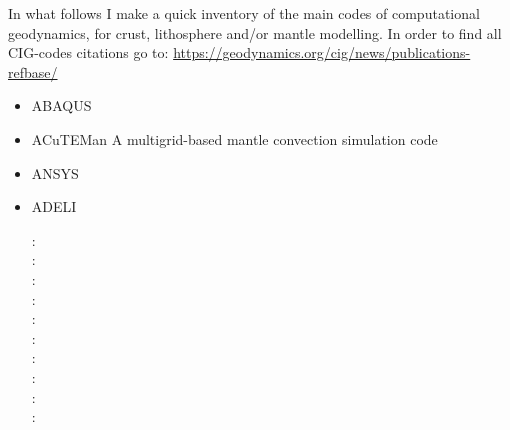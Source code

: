 
In what follows I make a quick inventory of the main codes of computational geodynamics, 
for crust, lithosphere and/or mantle modelling.
In order to find all CIG-codes citations go to: 
\url{https://geodynamics.org/cig/news/publications-refbase/}

\begin{itemize}

\item {\codefont ABAQUS} 

{\small
\noindent
\cite{brry01}
\cite{gedh02}
\cite{fumr03}
\cite{hapf06}
\cite{camg07}
\cite{kuhe09}
\cite{makh09}
\cite{camg10}
\cite{nalr12}
\cite{pevp15}
\cite{naam17}
\cite{naam18}
}

\item {\codefont ACuTEMan} 
A multigrid-based mantle convection simulation code

\cite{kame05}
\cite{miko15}
\cite{kamo15}


\item {\codefont ANSYS} 

\cite{nehe06}
\cite{guyr16}

\item {\codefont ADELI} 

\begin{scriptsize}
\noindent
\nineteenninetyseven: \cite{hajc97}\\
\twothousandone: \cite{chzh01}\\
\twothousandfour: \cite{gocl04}\\
\twothousandsix: \cite{vech06}\cite{golc06}\\
\twothousandeight: \cite{boht08a}\cite{boht08b}\\
\twothousandtwelve: \cite{gech12}\cite{gigh12}\\
\twothousandthirteen: \cite{wahd13}\\
\twothousandfourteen: \cite{cehg14}\\
\twothousandfifteen: \cite{ceag15}\\
\twothousandeighteen: \cite{cegm18}\cite{gehn18}
\end{scriptsize}


\end{itemize}
